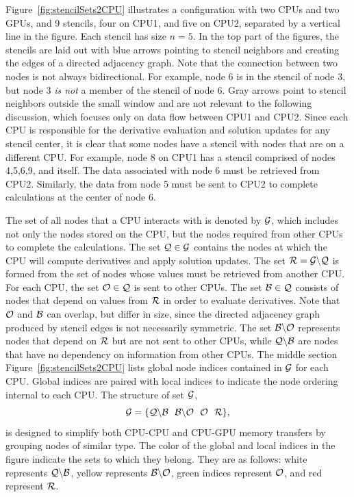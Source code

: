 \documentclass{report}
\begin{document}
Figure~\ref{fig:stencilSets2CPU} illustrates a configuration with two 
CPUs and two GPUs, and 9 stencils, four on CPU1, and five on CPU2, separated
by a vertical line in the figure. Each stencil
has size $n=5$. In the top part of the figures, the stencils are laid out
with blue arrows pointing to stencil neighbors and creating the edges of a directed adjacency graph. Note that the connection between two nodes is not 
always bidirectional. For example, node 6 is in the stencil of node 3, but 
node 3 {\em is not\/} a member of the stencil of node 6. 
Gray arrows point to stencil neighbors outside the small window and are not relevant to the following discussion, which focuses only on data flow between 
CPU1 and CPU2. 
Since each CPU is responsible for the derivative evaluation and solution updates for any stencil center, it is clear that some nodes have a stencil with nodes that are on a different CPU. For example, node 8 on CPU1 has a stencil comprised of
nodes 4,5,6,9, and itself. The data associated with node 6 must be retrieved
from CPU2. Similarly, the data from node 5 must be sent to CPU2 to 
complete calculations at the center of node 6.


The set of all nodes that a CPU interacts with is denoted by $\mathcal{G}$, which includes not only the nodes stored on the CPU, but the nodes required from other CPUs to complete the calculations. 
The set $\mathcal{Q}\in\mathcal{G}$ contains the nodes at which the CPU 
will compute derivatives and apply solution updates. 
The set $\mathcal{R} = \mathcal{G} \backslash \mathcal{Q}$ 
is formed from the set of nodes whose values must be retrieved from another CPU. 
For each CPU, the set $\mathcal{O}\in\mathcal{Q}$ is sent to other CPUs. The set $\mathcal{B}\in\mathcal{Q}$ consists of nodes that depend on  values from $\mathcal{R}$ in order to evaluate derivatives. Note that $\mathcal{O}$ and $\mathcal{B}$ can overlap, but differ in size, since the directed adjacency graph produced by stencil edges is not necessarily symmetric. The set $\mathcal{B} \backslash \mathcal{O}$ represents nodes that depend on $\mathcal{R}$ but are not sent to other CPUs, while $\mathcal{Q} \backslash \mathcal{B}$ are nodes that have no dependency on information from other CPUs.
The middle section Figure~\ref{fig:stencilSets2CPU} lists global node indices contained in $\mathcal{G}$ for each CPU. Global indices are paired with local indices to indicate the node ordering internal to each CPU. The structure of set $\mathcal{G}$,
   \begin{equation}
 		\setAllNodes = \{ \mathcal{Q}\backslash\mathcal{B} \ \ \mathcal{B}\backslash\mathcal{O} \ \ \mathcal{O} \ \ \setDepend \},
            \label{eqn:decompose_g}
        \end{equation}
 is designed to simplify both CPU-CPU and CPU-GPU memory transfers by grouping nodes of similar type. The color of the global and local indices in the figure
 indicate the sets to which they belong. They are as follows: white represents $\mathcal{Q} \backslash \mathcal{B}$, 
 yellow represents $\mathcal{B} \backslash \mathcal{O}$, green indices 
 represent $\mathcal{O}$, and red represent $\mathcal{R}$.  
\end{document}

